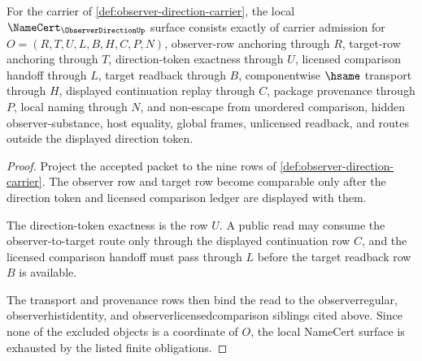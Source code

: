 \begin{theorem}
\label{thm:observer-direction-namecert-obligations}
For the carrier of \autoref{def:observer-direction-carrier}, the local $\NameCert_{\ObserverDirectionUp}$ surface consists exactly of carrier admission for $O=(R,T,U,L,B,H,C,P,N)$, observer-row anchoring through $R$, target-row anchoring through $T$, direction-token exactness through $U$, licensed comparison handoff through $L$, target readback through $B$, componentwise $\hsame$ transport through $H$, displayed continuation replay through $C$, package provenance through $P$, local naming through $N$, and non-escape from unordered comparison, hidden observer-substance, host equality, global frames, unlicensed readback, and routes outside the displayed direction token.
\end{theorem}
\begin{proof}
Project the accepted packet to the nine rows of \autoref{def:observer-direction-carrier}. The observer row and target row become comparable only after the direction token and licensed comparison ledger are displayed with them.

The direction-token exactness is the row $U$. A public read may consume the observer-to-target route only through the displayed continuation row $C$, and the licensed comparison handoff must pass through $L$ before the target readback row $B$ is available.

The transport and provenance rows then bind the read to the observerregular, observerhistidentity, and observerlicensedcomparison siblings cited above. Since none of the excluded objects is a coordinate of $O$, the local NameCert surface is exhausted by the listed finite obligations.
\end{proof}

